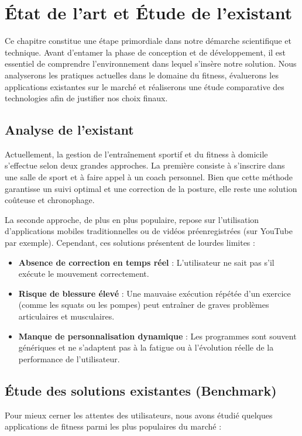 \chapter{État de l'art et Étude de l'existant}

Ce chapitre constitue une étape primordiale dans notre démarche scientifique et technique. Avant d'entamer la phase de conception et de développement, il est essentiel de comprendre l'environnement dans lequel s'insère notre solution. Nous analyserons les pratiques actuelles dans le domaine du fitness, évaluerons les applications existantes sur le marché et réaliserons une étude comparative des technologies afin de justifier nos choix finaux.

\section{Analyse de l'existant}
Actuellement, la gestion de l'entraînement sportif et du fitness à domicile s'effectue selon deux grandes approches. La première consiste à s'inscrire dans une salle de sport et à faire appel à un coach personnel. Bien que cette méthode garantisse un suivi optimal et une correction de la posture, elle reste une solution coûteuse et chronophage.

La seconde approche, de plus en plus populaire, repose sur l'utilisation d'applications mobiles traditionnelles ou de vidéos préenregistrées (sur YouTube par exemple). Cependant, ces solutions présentent de lourdes limites : 
\begin{itemize}
    \item \textbf{Absence de correction en temps réel} : L'utilisateur ne sait pas s'il exécute le mouvement correctement.
    \item \textbf{Risque de blessure élevé} : Une mauvaise exécution répétée d'un exercice (comme les squats ou les pompes) peut entraîner de graves problèmes articulaires et musculaires.
    \item \textbf{Manque de personnalisation dynamique} : Les programmes sont souvent génériques et ne s'adaptent pas à la fatigue ou à l'évolution réelle de la performance de l'utilisateur.
\end{itemize}

\section{Étude des solutions existantes (Benchmark)}
Pour mieux cerner les attentes des utilisateurs, nous avons étudié quelques applications de fitness parmi les plus populaires du marché :

